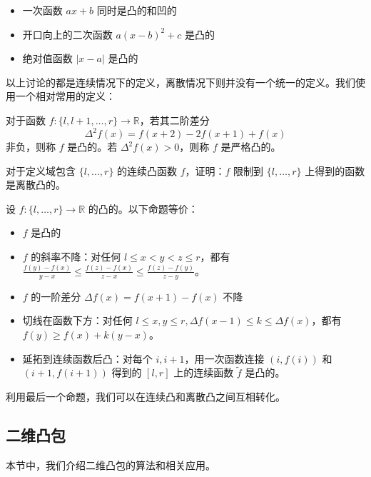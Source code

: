 \begin{example}
    \begin{itemize}
        \item 一次函数 $ax+b$ 同时是凸的和凹的
        \item 开口向上的二次函数 $a(x-b)^2+c$ 是凸的
        \item 绝对值函数 $|x-a|$ 是凸的
    \end{itemize}
\end{example}

以上讨论的都是连续情况下的定义，离散情况下则并没有一个统一的定义。我们使用一个相对常用的定义：
\begin{definition}[离散凸函数]
    对于函数 $f:\{l,l+1,\ldots,r\}\to \mathbb R$，若其二阶差分 
    $$
    \Delta^2 f(x)=f(x+2)-2f(x+1)+f(x)
    $$
    非负，则称 $f$ 是凸的。若 $\Delta^2 f(x)>0$，则称 $f$ 是严格凸的。
\end{definition}

\begin{exercise}
    对于定义域包含 $\{l,\ldots,r\}$ 的连续凸函数 $f$，证明：$f$ 限制到 $\{l,\ldots,r\}$ 上得到的函数是离散凸的。
\end{exercise}

\begin{property}
    设 $f:\{l,\ldots,r\}\to \mathbb R$ 的凸的。以下命题等价：
    \begin{itemize}
        \item $f$ 是凸的
        \item $f$ 的斜率不降：对任何 $l\le x<y<z\le r$，都有 $\frac{f(y)-f(x)}{y-x}\le \frac{f(z)-f(x)}{z-x}\le \frac{f(z)-f(y)}{z-y}$。
        \item $f$ 的一阶差分 $\Delta f(x)=f(x+1)-f(x)$ 不降
        \item 切线在函数下方：对任何 $l\le x,y\le r,\Delta f(x-1)\le k\le \Delta f(x)$，都有 $f(y)\ge f(x)+k(y-x)$。
        \item 延拓到连续函数后凸：对每个 $i,i+1$，用一次函数连接 $(i,f(i))$ 和 $(i+1,f(i+1))$ 得到的 $[l,r]$ 上的连续函数 $\tilde f$ 是凸的。
    \end{itemize}
\end{property}
利用最后一个命题，我们可以在连续凸和离散凸之间互相转化。

\subsection{二维凸包}

本节中，我们介绍二维凸包的算法和相关应用。

